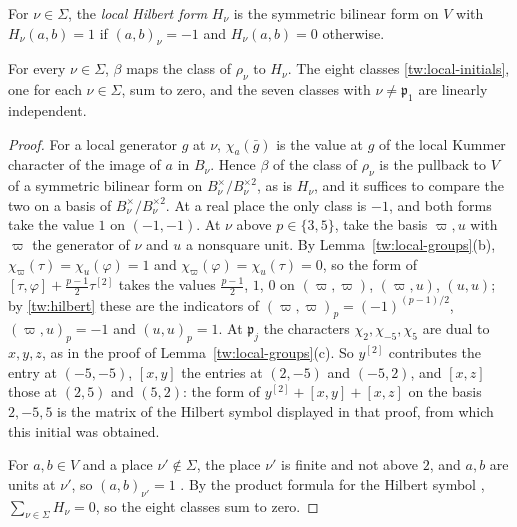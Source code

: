 \begin{definition}\label{tw:hilbert-form}
For $\nu\in\Sigma$, the \emph{local Hilbert form} $H_\nu$ is the symmetric
bilinear form on $V$ with $H_\nu(a,b)=1$ if $(a,b)_\nu=-1$ and
$H_\nu(a,b)=0$ otherwise.
\end{definition}

\begin{lemma}\label{tw:local-forms}
For every $\nu\in\Sigma$, $\beta$ maps the class of $\rho_\nu$ to $H_\nu$. The
eight classes \eqref{tw:local-initials}, one for each $\nu\in\Sigma$, sum to
zero, and the seven classes with $\nu\ne\mathfrak p_1$ are linearly
independent.
\end{lemma}

\begin{proof}
For a local generator $g$ at $\nu$, $\chi_a(\bar g)$ is the value at $g$ of
the local Kummer character of the image of $a$ in $B_\nu$. Hence
$\beta$ of the class of $\rho_\nu$ is the pullback to $V$ of a symmetric
bilinear form on $B_\nu^\times/B_\nu^{\times2}$, as is $H_\nu$, and it
suffices to compare the two on a basis of $B_\nu^\times/B_\nu^{\times2}$. At a
real place the only class is $-1$, and both forms take the value $1$ on
$(-1,-1)$. At $\nu$ above $p\in\{3,5\}$, take the basis $\varpi,u$ with
$\varpi$ the generator of $\nu$ and $u$ a nonsquare unit. By
Lemma~\ref{tw:local-groups}(b), $\chi_\varpi(\tau)=\chi_u(\varphi)=1$ and
$\chi_\varpi(\varphi)=\chi_u(\tau)=0$, so the form of
$[\tau,\varphi]+\frac{p-1}2\tau^{[2]}$ takes the values $\frac{p-1}2$, $1$,
$0$ on $(\varpi,\varpi)$, $(\varpi,u)$, $(u,u)$; by \eqref{tw:hilbert} these
are the indicators of $(\varpi,\varpi)_p=(-1)^{(p-1)/2}$, $(\varpi,u)_p=-1$
and $(u,u)_p=1$. At $\mathfrak p_j$ the characters $\chi_2,\chi_{-5},\chi_5$
are dual to $x,y,z$, as in the proof of Lemma~\ref{tw:local-groups}(c). So
$y^{[2]}$ contributes the entry at $(-5,-5)$, $[x,y]$ the entries at $(2,-5)$
and $(-5,2)$, and $[x,z]$ those at $(2,5)$ and $(5,2)$: the form of
$y^{[2]}+[x,y]+[x,z]$ on the basis $2,-5,5$ is the matrix of the Hilbert
symbol displayed in that proof, from which this initial was obtained.

For $a,b\in V$ and a place $\nu'\notin\Sigma$, the place $\nu'$ is finite
and not above $2$, and $a,b$ are units at $\nu'$, so $(a,b)_{\nu'}=1$
\cite[Chapter~VIII, 5.8]{MilneCFT}. By the
product formula for the Hilbert symbol \cite[Chapter~V, Example~5.4]{MilneCFT},
$\sum_{\nu\in\Sigma}H_\nu=0$, so the eight classes sum to zero.


\end{proof}

